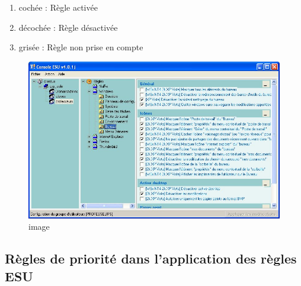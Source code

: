 \documentclass{article}
\makeatletter
\def\maxwidth{\ifdim\Gin@nat@width>\linewidth\linewidth
\else\Gin@nat@width\fi}
\let\Oldincludegraphics\includegraphics
\renewcommand{\includegraphics}[1]{\Oldincludegraphics[width=\maxwidth]{#1}}
\makeatother
\begin{document}
\begin{enumerate}[1.]
\item
  cochée : Règle activée
\item
  décochée : Règle désactivée
\item
  grisée : Règle non prise en compte
\end{enumerate}
\begin{figure}[htbp]
\centering
\includegraphics{scribe_html_3a7fb0ad.jpg}
\caption{image}
\end{figure}

\subsection{Règles de priorité dans l'application des règles ESU}
\end{document}
